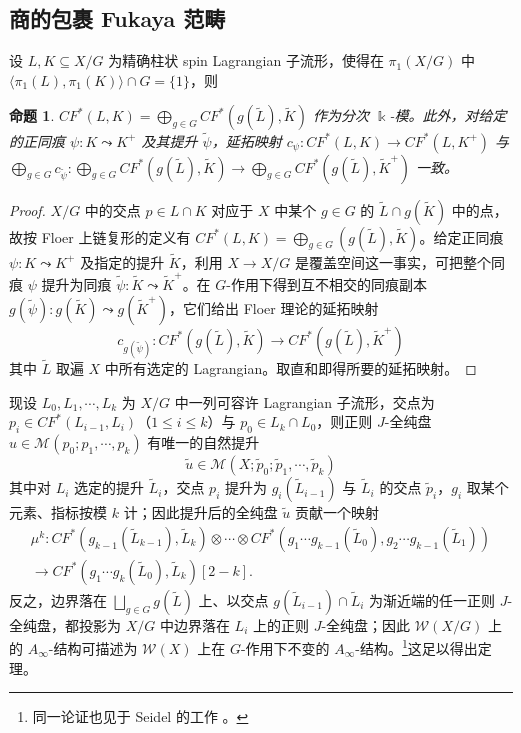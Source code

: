 \documentclass[11pt,a4paper]{article}
\theoremstyle{cnth}
\newtheorem{prp}[thm]{命题}
\begin{document}
\subsection{商的包裹 Fukaya 范畴}
    设 $L,K\subseteq X/G$ 为精确柱状 spin Lagrangian 子流形，使得在 $\pi_1 (X/G)$ 中 $\langle\pi_1 (L),\pi_1 (K)\rangle\cap G= \{1\}$，则
\begin{prp}
    $CF^{\ast} (L,K) =\displaystyle\bigoplus_{g\in G} CF^{\ast} (g(\tilde{L}),\tilde{K})$ 作为分次 $\Bbbk$-模。此外，对给定的正同痕 $\psi\colon K\leadsto K^+$ 及其提升 $\tilde{\psi}$，延拓映射 $c_{\psi}\colon CF^{\ast} (L,K)\to CF^{\ast} (L,K^+)$ 与 $\displaystyle\bigoplus_{g\in G} c_{\tilde{\psi}}\colon \bigoplus_{g\in G} CF^{\ast} (g(\tilde{L}),\tilde{K})\to\bigoplus_{g\in G} CF^{\ast} (g(\tilde{L}),\tilde{K}^+)$ 一致。
\end{prp}
\begin{proof}
    $X/G$ 中的交点 $p\in L\cap K$ 对应于 $X$ 中某个 $g\in G$ 的 $\tilde{L}\cap g(\tilde{K})$ 中的点，故按 Floer 上链复形的定义有 $CF^{\ast} (L,K)=\displaystyle\bigoplus_{g\in G} (g(\tilde{L}), \tilde{K})$。给定正同痕 $\psi\colon K\leadsto K^+$ 及指定的提升 $\tilde{K}$，利用 $X\to X/G$ 是覆盖空间这一事实，可把整个同痕 $\psi$ 提升为同痕 $\tilde{\psi}\colon \tilde{K}\leadsto\tilde{K}^+$。在 $G$-作用下得到互不相交的同痕副本 $g(\tilde{\psi})\colon g(\tilde{K})\leadsto g(\tilde{K}^+)$，它们给出 Floer 理论的延拓映射
\[
        c_{g(\tilde{\psi})}\colon CF^{\ast} (g(\tilde{L}),\tilde{K})\to CF^{\ast} (g(\tilde{L}),\tilde{K}^+)
\]
其中 $\tilde{L}$ 取遍 $X$ 中所有选定的 Lagrangian。取直和即得所要的延拓映射。
\end{proof}
    现设 $L_0, L_1,\dotsb ,L_k$ 为 $X/G$ 中一列可容许 Lagrangian 子流形，交点为 $p_i\in CF^{\ast} (L_{i-1}, L_i)$（$1\leq i\leq k$）与 $p_0\in L_k\cap L_0$，则正则 $J$-全纯盘 $u\in\mathcal{M} (p_0;p_1,\dotsb ,p_k)$ 有唯一的自然提升
\[
\tilde{u}\in\mathcal{M}(X;\tilde{p}_0;\tilde{p}_1,\dotsb ,\tilde{p}_k)
\]
其中对 $L_i$ 选定的提升 $\tilde{L}_i$，交点 $p_i$ 提升为 $g_i (\tilde{L}_{i-1})$ 与 $\tilde{L}_i$ 的交点 $\tilde{p}_i$，$g_i$ 取某个元素、指标按模 $k$ 计；因此提升后的全纯盘 $\tilde{u}$ 贡献一个映射
\begin{multline*}
\mu^k\colon CF^{\ast} (g_{k-1}(\tilde{L}_{k-1}),\tilde{L}_k)\otimes\dotsb\otimes CF^{\ast} (g_1\dotsb g_{k-1}(\tilde{L}_0),g_2\dotsb g_{k-1} (\tilde{L}_1))\\
\to CF^{\ast} (g_1\dotsb g_k (\tilde{L}_0),\tilde{L}_k)[2-k].
\end{multline*}
反之，边界落在 $\displaystyle\bigsqcup_{g\in G}g(\tilde{L})$ 上、以交点 $g(\tilde{L}_{i-1})\cap\tilde{L}_i$ 为渐近端的任一正则 $J$-全纯盘，都投影为 $X/G$ 中边界落在 $L_i$ 上的正则 $J$-全纯盘；因此 $\mathcal{W} (X/G)$ 上的 $A_{\infty}$-结构可描述为 $\mathcal{W} (X)$ 上在 $G$-作用下不变的 $A_{\infty}$-结构。\footnote{同一论证也见于 Seidel 的工作 \cite{Seidel11}。}这足以得出定理。
\end{document}

